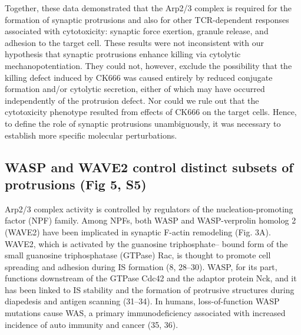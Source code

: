 Together, these data demonstrated that the Arp2/3 complex is required for the formation of synaptic protrusions and also for other TCR-dependent responses associated with cytotoxicity: synaptic force exertion, granule release, and adhesion to the target cell. These results were not inconsistent with our hypothesis that synaptic protrusions enhance killing via cytolytic mechanopotentiation. They could not, however, exclude the possibility that the killing defect induced by CK666 was caused entirely by reduced conjugate formation and/or cytolytic secretion, either of which may have occurred independently of the protrusion defect. Nor could we rule out that the cytotoxicity phenotype resulted from effects of CK666 on the target cells. Hence, to define the role of synaptic protrusions unambiguously, it was necessary to establish more specific molecular perturbations.

\subsection{WASP and WAVE2 control distinct subsets of protrusions (Fig 5, S5)}
Arp2/3 complex activity is controlled by regulators of the nucleation-promoting factor (NPF) family. Among NPFs, both WASP and WASP-verprolin homolog 2 (WAVE2) have been implicated in synaptic F-actin remodeling (Fig. 3A). WAVE2, which is activated by the guanosine triphosphate– bound form of the small guanosine triphosphatase (GTPase) Rac, is thought to promote cell spreading and adhesion during IS formation (8, 28–30). WASP, for its part, functions downstream of the GTPase Cdc42 and the adaptor protein Nck, and it has been linked to IS stability and the formation of protrusive structures during diapedesis and antigen scanning (31–34). In humans, loss-of-function WASP mutations cause WAS, a primary immunodeficiency associated with increased incidence of auto immunity and cancer (35, 36).

